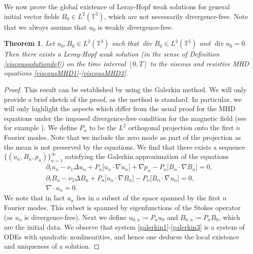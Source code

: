 \documentclass[12pt,a4paper]{article}
\newtheorem{theorem}{Theorem}[section]
\theoremstyle{definition}
\theoremstyle{remark}
\numberwithin{equation}{section}
\DeclareMathOperator{\Div}{div}
\begin{document}
We now prove the global existence of Leray-Hopf weak solutions for general initial vector fields $B_0 \in L^2 (\mathbb{T}^3)$, which are not necessarily divergence-free. Note that we always assume that $u_0$ is weakly divergence-free.
\begin{theorem}
Let $u_0, B_0 \in L^2 (\mathbb{T}^3)$ such that $\Div B_0 \in L^2 (\mathbb{T}^3)$ and $\Div u_0 = 0$. Then there exists a Leray-Hopf weak solution (in the sense of Definition \ref{viscoussolutiondef}) on the time interval $[0,T]$ to the viscous and resistive MHD equations \eqref{viscousMHD1}-\eqref{viscousMHD3}. 
\end{theorem}
\begin{proof}
This result can be established by using the Galerkin method. We will only provide a brief sketch of the proof, as the method is standard. In particular, we will only highlight the aspects which differ from the usual proof for the MHD equations under the imposed divergence-free condition for the magnetic field (see for example \cite[~Theorem 2.2]{wu}). We define $P_n$ to be the $L^2$ orthogonal projection onto the first $n$ Fourier modes. Note that we include the zero mode as part of the projection as the mean is not preserved by the equations. We find that there exists a sequence $\{ (u_n, B_n, p_n) \}_{n=1}^\infty$ satisfying the Galerkin approximation of the equations
\begin{align}
&\partial_t u_n - \nu_1 \Delta u_n + P_n \big[ u_n \cdot \nabla u_n \big] + \nabla p_n - P_n \big[ B_n \cdot \nabla B_n \big] = 0, \label{galerkin1} \\
&\partial_t B_n - \nu_2 \Delta B_n + P_n \big[ u_n \cdot \nabla B_n \big] - P_n \big[ B_n \cdot \nabla u_n \big] = 0, \label{galerkin2} \\
&\nabla \cdot u_n = 0. \label{galerkin3}
\end{align}
We note that in fact $u_n$ lies in a subset of the space spanned by the first $n$ Fourier modes. This subset is spanned by eigenfunctions of the Stokes operator (as $u_n$ is divergence-free). Next we define $u_{0,n} \coloneqq P_n u_0$ and $B_{0,n} \coloneqq P_n B_0$, which are the initial data.  We observe that system \eqref{galerkin1}-\eqref{galerkin3} is a system of ODEs with quadratic nonlinearities, and hence one deduces the local existence and uniqueness of a solution.


\end{proof}
\end{document}
